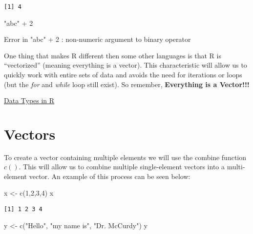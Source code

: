 \documentclass[
  letterpaper,
  DIV=11,
  numbers=noendperiod]{scrreprt}
\newenvironment{Shaded}{\begin{snugshade}}{\end{snugshade}}
\newcommand{\DecValTok}[1]{\textcolor[rgb]{0.68,0.00,0.00}{#1}}
\newcommand{\FunctionTok}[1]{\textcolor[rgb]{0.28,0.35,0.67}{#1}}
\newcommand{\NormalTok}[1]{\textcolor[rgb]{0.00,0.23,0.31}{#1}}
\newcommand{\OtherTok}[1]{\textcolor[rgb]{0.00,0.23,0.31}{#1}}
\newcommand{\SpecialCharTok}[1]{\textcolor[rgb]{0.37,0.37,0.37}{#1}}
\newcommand{\StringTok}[1]{\textcolor[rgb]{0.13,0.47,0.30}{#1}}
\begin{document}
\begin{verbatim}
[1] 4
\end{verbatim}

\begin{Shaded}
\begin{Highlighting}[]
\StringTok{"abc"} \SpecialCharTok{+} \DecValTok{2}
\end{Highlighting}
\end{Shaded}

{Error in "abc" + 2 : non-numeric argument to binary operator}

One thing that makes R different then some other languages is that R is
``vectorized'' (meaning everything is a vector). This characteristic
will allow us to quickly work with entire sets of data and avoids the
need for iterations or loops (but the \emph{for} and \emph{while} loop
still exist). So remember, \textbf{Everything is a Vector!!!}

\begin{watch}{}{}
    \href{https://youtu.be/6m-hh-NG0X0}{Data Types in R}
\end{watch}

\section{Vectors}\label{vectors}

To create a vector containing multiple elements we will use the combine
function \(c()\). This will allow us to combine multiple single-element
vectors into a multi-element vector. An example of this process can be
seen below:

\begin{Shaded}
\begin{Highlighting}[]
\NormalTok{x }\OtherTok{\textless{}{-}} \FunctionTok{c}\NormalTok{(}\DecValTok{1}\NormalTok{,}\DecValTok{2}\NormalTok{,}\DecValTok{3}\NormalTok{,}\DecValTok{4}\NormalTok{)}
\NormalTok{x}
\end{Highlighting}
\end{Shaded}

\begin{verbatim}
[1] 1 2 3 4
\end{verbatim}

\begin{Shaded}
\begin{Highlighting}[]
\NormalTok{y }\OtherTok{\textless{}{-}} \FunctionTok{c}\NormalTok{(}\StringTok{"Hello"}\NormalTok{, }\StringTok{"my name is"}\NormalTok{, }\StringTok{"Dr. McCurdy"}\NormalTok{)}
\NormalTok{y}
\end{Highlighting}
\end{Shaded}
\end{document}
